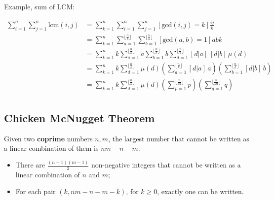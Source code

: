 Example, sum of LCM:

\begin{align*}
    \sum_{i = 1}^n \sum_{j = 1}^n \text{lcm}(i, j) &=
    \sum_{k = 1}^n\sum_{i=1}^n\sum_{j=1}^n [\text{gcd}(i, j) = k] \frac{ij}{k} \\
    &= \sum_{k = 1}^n\sum_{a=1}^{\lfloor \frac{n}{k} \rfloor}\sum_{b=1}^{\lfloor \frac{n}{k} \rfloor} [\text{gcd}(a, b) = 1] abk \\
    &= \sum_{k = 1}^n k \sum_{a=1}^{\lfloor \frac{n}{k} \rfloor} a \sum_{b=1}^{\lfloor \frac{n}{k} \rfloor} b \sum_{d=1}^{\lfloor \frac{n}{k} \rfloor}[d|a]\,[d|b] \, \mu(d) \\
    &= \sum_{k = 1}^n k \sum_{d=1}^{\lfloor \frac{n}{k} \rfloor}  \mu(d) \left(\sum_{a=1}^{\lfloor \frac{n}{k} \rfloor} [d|a] \, a\right) \left(\sum_{b=1}^{\lfloor \frac{n}{k} \rfloor} [d|b] \, b\right) \\
    &= \sum_{k = 1}^n k \sum_{d=1}^{\lfloor \frac{n}{k} \rfloor}  \mu(d) \left(\sum_{p=1}^{\lfloor \frac{n}{kd} \rfloor} p\right) \left(\sum_{q=1}^{\lfloor \frac{n}{kd} \rfloor} q\right) \\
\end{align*}

\subsection{Chicken McNugget Theorem}

Given two \textbf{coprime} numbers $n, m$, the largest number that cannot be written as a linear combination of them is $nm - n - m$.

\begin{itemize}
    \item There are $\frac{(n-1)(m-1)}{2}$ non-negative integers that cannot be written as a linear combination of $n$ and $m$;
    \item For each pair $(k, nm - n - m - k)$, for $k \geq 0$, exactly one can be written.
\end{itemize}




